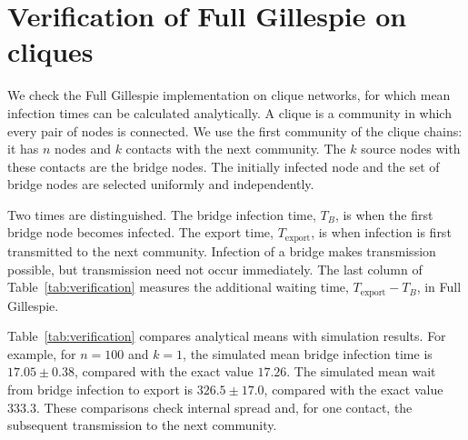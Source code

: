 \documentclass{ieeeaccess}
\let\AccessYear\year
\let\year\TeXyear
\newcommand{\yulian}[2]{{\color{red}#1}}
\begin{document}
\AccessYear{XXXX}
\appendices
\section{\yulian{Verification of Full Gillespie on cliques}{Clique formulas and verification}}
\label{app:clique}

\yulian{We check the Full Gillespie implementation on clique networks, for which mean infection times can be calculated analytically. A clique is a community in which every pair of nodes is connected. We use the first community of the clique chains: it has $n$ nodes and $k$ contacts with the next community. The $k$ source nodes with these contacts are the bridge nodes. The initially infected node and the set of bridge nodes are selected uniformly and independently.

Two times are distinguished. The bridge infection time, $T_B$, is when the first bridge node becomes infected. The export time, $T_{\mathrm{export}}$, is when infection is first transmitted to the next community. Infection of a bridge makes transmission possible, but transmission need not occur immediately. The last column of Table~\ref{tab:verification} measures the additional waiting time, $T_{\mathrm{export}}-T_B$, in Full Gillespie.}{}

\yulian{Table~\ref{tab:verification} compares analytical means with simulation results. For example, for $n=100$ and $k=1$, the simulated mean bridge infection time is $17.05\pm0.38$, compared with the exact value $17.26$. The simulated mean wait from bridge infection to export is $326.5\pm17.0$, compared with the exact value $333.3$. These comparisons check internal spread and, for one contact, the subsequent transmission to the next community.}{}
\end{document}
